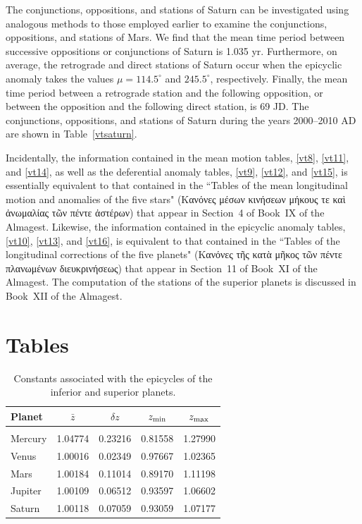 The conjunctions, oppositions, and stations of Saturn can be investigated
using analogous methods to those employed earlier to examine the
conjunctions, oppositions, and stations of Mars. We find that the mean
time period between successive oppositions or conjunctions of
Saturn is 1.035 yr. Furthermore, on average, the retrograde and direct
stations of Saturn occur when the epicyclic anomaly takes the
values $\mu=114.5^\circ$ and $245.5^\circ$, respectively. Finally,
the mean time period between a retrograde station and the following
opposition, or between the opposition and the following direct
station, is 69 JD. The conjunctions, oppositions, and stations of Saturn
during the years 2000--2010 AD are shown in Table~\ref{vtsaturn}.

Incidentally, the information contained in the mean motion tables, \ref{vt8}, \ref{vt11}, and \ref{vt14}, as well as the deferential anomaly tables, \ref{vt9}, \ref{vt12}, and \ref{vt15}, is essentially equivalent to that contained in 
the ``Tables of the mean longitudinal motion and anomalies of the five stars" (Κανόνες μέσων κινήσεων μήκους τε καὶ ἀνωμαλίας τῶν πέντε ἀστέρων)
that appear in Section~4 of Book~IX of the Almagest. Likewise, the information contained in the epicyclic anomaly tables, \ref{vt10}, \ref{vt13}, and \ref{vt16}, is equivalent
to that contained in the ``Tables of the longitudinal corrections of the five planets" (Κανόνες τῆς κατὰ μῆκος τῶν πέντε πλανωμένων διευκρινήσεως) that appear in Section~11 of Book~XI of the Almagest. The computation of the stations of the superior planets is
discussed in Book~XII of the Almagest. 

\clearpage
\section{Tables}

\begin{table}[h]
\centering
\begin{tabular}{l|cccc}
Planet & $\bar{z}$ & $\delta z$ & $z_{\rm min}$ & $z_{\rm max}$\\\hline
&&&&\\[-2ex]
Mercury & 1.04774 & 0.23216 & 0.81558 & 1.27990\\
Venus & 1.00016 & 0.02349 & 0.97667 & 1.02365\\
Mars & 1.00184 & 0.11014 & 0.89170 & 1.11198\\
Jupiter & 1.00109 & 0.06512 & 0.93597 & 1.06602\\
Saturn & 1.00118 & 0.07059 & 0.93059 & 1.07177\\
\end{tabular}
\caption{Constants associated with the epicycles of the inferior and superior planets.}\label{vtx}
\end{table}

